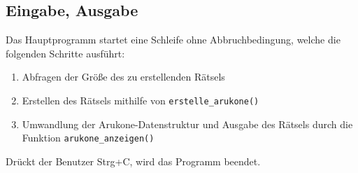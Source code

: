 \subsection{Eingabe, Ausgabe}
Das Hauptprogramm startet eine Schleife ohne Abbruchbedingung, welche die folgenden Schritte ausführt:
\begin{enumerate}
      \item Abfragen der Größe des zu erstellenden Rätsels
      \item Erstellen des Rätsels mithilfe von \texttt{erstelle\_arukone()}
      \item Umwandlung der Arukone-Datenstruktur und Ausgabe des Rätsels durch die Funktion \texttt{arukone\_anzeigen()}
\end{enumerate}
Drückt der Benutzer Strg+C, wird das Programm beendet.
